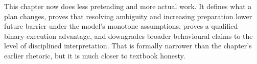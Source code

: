 \begin{summarybox}
This chapter now does less pretending and more actual work. It defines what a
plan changes, proves that resolving ambiguity and increasing preparation lower
future barrier under the model's monotone assumptions, proves a qualified
binary-execution advantage, and downgrades broader behavioural claims to the
level of disciplined interpretation. That is formally narrower than the
chapter's earlier rhetoric, but it is much closer to textbook honesty.
\end{summarybox}
